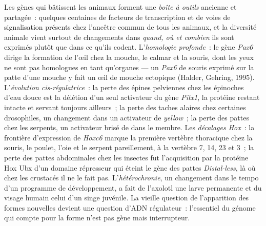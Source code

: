\begin{definition}\label{def:b3:developmental-genetics:evodevo}
Les gènes qui bâtissent les animaux forment une \emph{boîte à outils}
ancienne et partagée~: quelques centaines de facteurs de transcription
et de voies de signalisation présents chez l'ancêtre commun de tous les
animaux, et la diversité animale vient surtout de changements dans
\emph{quand, où et combien} ils sont exprimés plutôt que dans ce qu'ils
codent. L'\emph{homologie profonde}~: le gène \emph{Pax6} dirige la
formation de l'œil chez la mouche, le calmar et la souris, dont les yeux
ne sont pas homologues en tant qu'organes --- un \emph{Pax6} de souris
exprimé sur la patte d'une mouche y fait un œil de mouche ectopique
(Halder, Gehring, 1995). L'\emph{évolution cis-régulatrice}~: la perte
des épines pelviennes chez les épinoches d'eau douce est la délétion
d'un seul activateur du gène \emph{Pitx1}, la protéine restant intacte
et servant toujours ailleurs~; la perte des taches alaires chez
certaines drosophiles, un changement dans un activateur de
\emph{yellow}~; la perte des pattes chez les serpents, un activateur
brisé de \emph{} dans le membre. Les \emph{décalages
Hox}~: la frontière d'expression de \emph{Hoxc6} marque la première
vertèbre thoracique chez la souris, le poulet, l'oie et le serpent
pareillement, à la vertèbre 7, 14, 23 et 3~; la perte des pattes
abdominales chez les insectes fut l'acquisition par la protéine Hox Ubx
d'un domaine répresseur qui éteint le gène des pattes
\emph{Distal-less}, là où chez les crustacés il ne le fait pas.
L'\emph{hétérochronie}, un changement dans le tempo d'un programme de
développement, a fait de l'axolotl une larve permanente et du visage
humain celui d'un singe juvénile. La vieille question de l'apparition
des formes nouvelles devient une question d'ADN régulateur~: l'essentiel
du génome qui compte pour la forme n'est pas gène mais interrupteur.
\end{definition}

